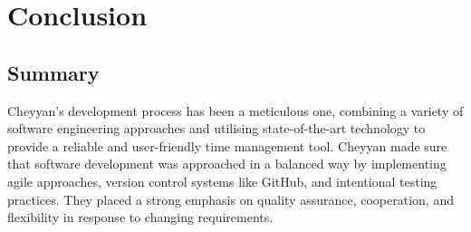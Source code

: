 \documentclass{l4proj}
\begin{document}






\chapter{Conclusion}

\section{Summary}

Cheyyan's development process has been a meticulous one, combining a variety of software engineering approaches and utilising state-of-the-art technology to provide a reliable and user-friendly time management tool. Cheyyan made sure that software development was approached in a balanced way by implementing agile approaches, version control systems like GitHub, and intentional testing practices. They placed a strong emphasis on quality assurance, cooperation, and flexibility in response to changing requirements.
\end{document}
